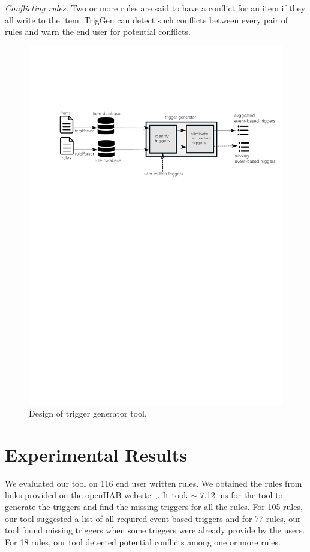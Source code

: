 \documentclass{sig-alternate-05-2015}
\begin{document}
\emph{Conflicting rules.} Two or more rules are said to have a conflict for an item if they all write to the item. TrigGen can detect such conflicts between every pair of rules and warn the end user for potential conflicts. 
\begin{figure}
\centering
\includegraphics [trim=2cm 18cm 0 5.5cm, scale=0.45]{images/design.pdf}
\caption{Design of trigger generator tool.}
\label{fig:design}
\end{figure} 
 
\section{Experimental Results}
We evaluated our tool on 116 end user written rules. We obtained the rules from links provided on the openHAB website~\cite{data1},\cite{data2}. It took $\sim$ 7.12 ms for the tool to generate the triggers and find the missing triggers for all the rules. For 105 rules, our tool suggested a list of all required event-based triggers and for 77 rules, our tool found missing triggers when some triggers were already provide by the users. For 18 rules, our tool detected potential conflicts among one or more rules. 
\end{document}
